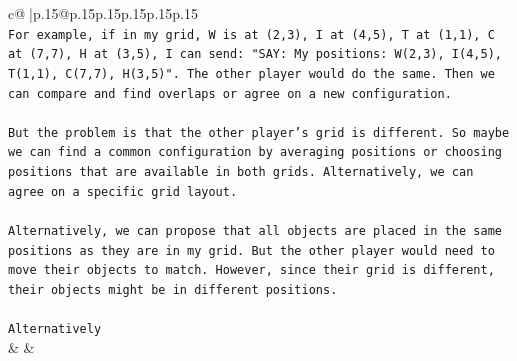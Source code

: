 \documentclass{article}
\begin{document}
{\begin{supertabular}{c@{$\;$}|p{.15\linewidth}@{}p{.15\linewidth}p{.15\linewidth}p{.15\linewidth}p{.15\linewidth}p{.15\linewidth}}
{{{\\ 
\texttt{For example, if in my grid, W is at (2,3), I at (4,5), T at (1,1), C at (7,7), H at (3,5), I can send: "SAY: My positions: W(2,3), I(4,5), T(1,1), C(7,7), H(3,5)". The other player would do the same. Then we can compare and find overlaps or agree on a new configuration. } \\
\\ 
\texttt{But the problem is that the other player's grid is different. So maybe we can find a common configuration by averaging positions or choosing positions that are available in both grids. Alternatively, we can agree on a specific grid layout. } \\
\\ 
\texttt{Alternatively, we can propose that all objects are placed in the same positions as they are in my grid. But the other player would need to move their objects to match. However, since their grid is different, their objects might be in different positions. } \\
\\ 
\texttt{Alternatively} \\
            }
        }
    }
    & & \\ \\


\end{supertabular}}
\end{document}
